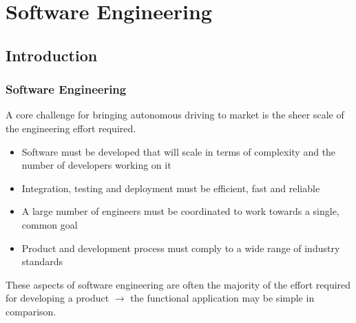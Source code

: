 
\section{Software Engineering}

\subsection{Introduction}

\begin{frame}
\frametitle{Software Engineering}
A core challenge for bringing autonomous driving to market is the sheer scale
of the engineering effort required.
\begin{itemize}
    \item Software must be developed that will scale in terms of complexity
        and the number of developers working on it
    \item Integration, testing and deployment must be efficient, fast and
        reliable
    \item A large number of engineers must be coordinated to work towards a
        single, common goal
    \item Product and development process must comply to a wide range of
        industry standards
\end{itemize}
\pause
\begin{block}{}
These aspects of software engineering are often the majority of the effort 
required for developing a product $\rightarrow$ the functional application
may be simple in comparison.
\end{block}
\end{frame}

